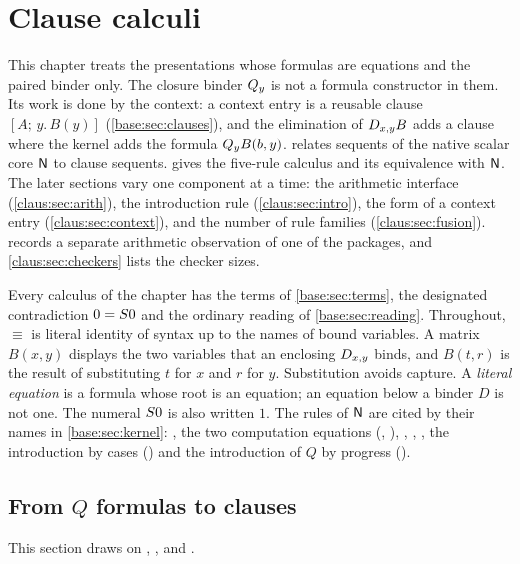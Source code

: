 \chapter{Clause calculi}
\label{prov:ch:claus}
\label{claus:chap}

This chapter treats the presentations whose formulas are equations and the
paired binder only. The closure binder $Q_{y}$ is not a formula constructor
in them. Its work is done by the context: a context entry is a reusable
clause $[A;\,y.\,B(y)]$ (\cref{base:sec:clauses}), and the elimination of
$D_{x,y}B$ adds a clause where the kernel adds the formula $Q_{y}B(b,y)$.
 relates sequents of the native scalar core $\mathsf{N}$ to
clause sequents.  gives the five-rule calculus and its
equivalence with $\mathsf{N}$. The later sections vary one component at a time: the
arithmetic interface (\cref{claus:sec:arith}), the introduction rule
(\cref{claus:sec:intro}), the form of a context entry
(\cref{claus:sec:context}), and the number of rule families
(\cref{claus:sec:fusion}).  records a separate
arithmetic observation of one of the packages, and
\cref{claus:sec:checkers} lists the checker sizes.

Every calculus of the chapter has the terms of \cref{base:sec:terms}, the
designated contradiction $0=S 0$ and the ordinary reading of
\cref{base:sec:reading}. Throughout, $\equiv$ is literal identity of syntax
up to the names of bound variables. A matrix $B(x,y)$ displays the two
variables that an enclosing $D_{x,y}$ binds, and $B(t,r)$ is the result of
substituting $t$ for $x$ and $r$ for $y$. Substitution avoids capture. A
\emph{literal equation} is a formula whose root is an equation; an equation
below a binder $D$ is not one. The numeral $S 0$ is also written $1$.
The rules of $\mathsf{N}$ are cited by their names in \cref{base:sec:kernel}:
, the two computation equations (,
), , , , the
introduction by cases () and the introduction of $Q$ by
progress ().

\section{From \texorpdfstring{$Q$}{Q} formulas to clauses}
\label{claus:sec:qfree}

This section draws on , ,
 and .

